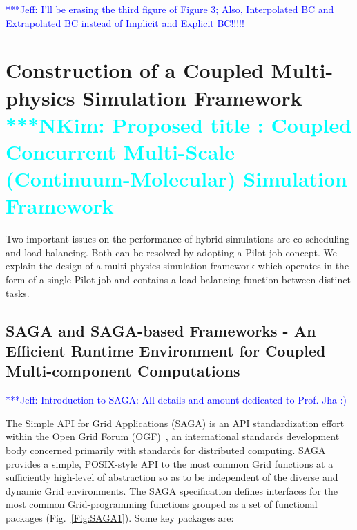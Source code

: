 \documentclass[preprint,12pt]{elsarticle}
\newcommand{\Nkimnote}[1]{ {\textcolor{cyan} { ***NKim: #1 }}}
\newcommand{\skonote}[1]{ {\textcolor{blue} { ***Jeff: #1 }}}
\newcommand{\Nkimnote}[1]{}
\newcommand{\skonote}[1]{}
\begin{document}
\skonote{I'll be erasing the third figure of Figure 3; Also, Interpolated BC and Extrapolated BC instead of Implicit and Explicit BC!!!!!}




%



\section{Construction of a Coupled Multi-physics Simulation Framework
\\
\Nkimnote{Proposed title : Coupled Concurrent Multi-Scale (Continuum-Molecular) Simulation Framework}}

Two important issues on the performance of hybrid simulations are co-scheduling and load-balancing. Both can be resolved by adopting a Pilot-job concept. We explain the design of a multi-physics simulation framework which operates in the form of a single Pilot-job and contains a load-balancing function between distinct tasks.

\subsection{SAGA and SAGA-based Frameworks - An Efficient Runtime Environment for Coupled Multi-component Computations}

\skonote{Introduction to SAGA: All details and amount dedicated to Prof. Jha :) }

The Simple API for Grid Applications (SAGA) is an API standardization effort within the Open Grid Forum (OGF)~\cite{ogf_web}, an international standards development body concerned primarily with standards for distributed computing. SAGA provides a simple, POSIX-style API to the most common Grid functions at a sufficiently high-level of abstraction so as to be independent of the diverse and dynamic Grid environments. The SAGA specification defines interfaces for the most common Grid-programming functions grouped as a set of functional packages (Fig.~\ref{Fig:SAGA1}). Some key packages are:
\end{document}
